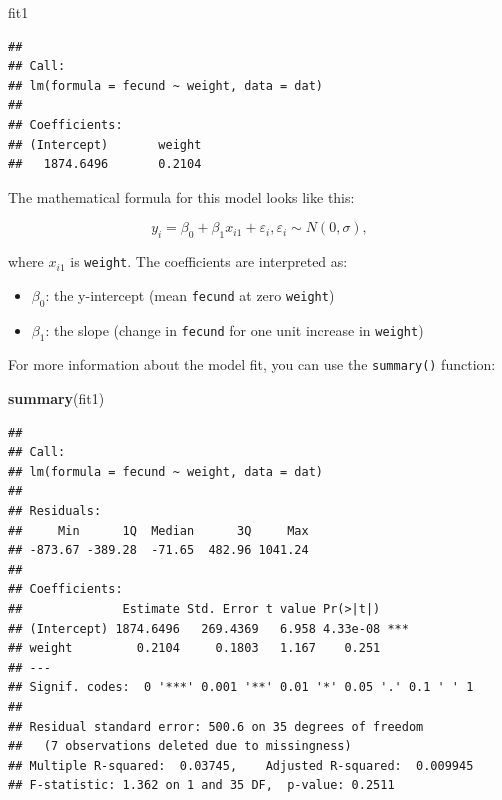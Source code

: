 \documentclass[]{book}
\newenvironment{Shaded}{\begin{snugshade}}{\end{snugshade}}
\newcommand{\KeywordTok}[1]{\textcolor[rgb]{0.13,0.29,0.53}{\textbf{#1}}}
\newcommand{\NormalTok}[1]{#1}
\providecommand{\tightlist}{%
  \setlength{\itemsep}{0pt}\setlength{\parskip}{0pt}}
\theoremstyle{definition}
\theoremstyle{definition}
\theoremstyle{definition}
\theoremstyle{remark}
\begin{document}
\begin{Shaded}
\begin{Highlighting}[]
\NormalTok{fit1}
\end{Highlighting}
\end{Shaded}

\begin{verbatim}
## 
## Call:
## lm(formula = fecund ~ weight, data = dat)
## 
## Coefficients:
## (Intercept)       weight  
##   1874.6496       0.2104
\end{verbatim}

The mathematical formula for this model looks like this:

\begin{equation}
  y_i=\beta_0 + \beta_1 x_{i1} + \varepsilon_i, \varepsilon_i \sim N(0,\sigma),
\label{eq:lin-reg}
\end{equation}

where \(x_{i1}\) is \texttt{weight}. The coefficients are interpreted
as:

\begin{itemize}
\tightlist
\item
  \(\beta_0\): the y-intercept (mean \texttt{fecund} at zero
  \texttt{weight})
\item
  \(\beta_1\): the slope (change in \texttt{fecund} for one unit
  increase in \texttt{weight})
\end{itemize}

For more information about the model fit, you can use the
\texttt{summary()} function:

\begin{Shaded}
\begin{Highlighting}[]
\KeywordTok{summary}\NormalTok{(fit1)}
\end{Highlighting}
\end{Shaded}

\begin{verbatim}
## 
## Call:
## lm(formula = fecund ~ weight, data = dat)
## 
## Residuals:
##     Min      1Q  Median      3Q     Max 
## -873.67 -389.28  -71.65  482.96 1041.24 
## 
## Coefficients:
##              Estimate Std. Error t value Pr(>|t|)    
## (Intercept) 1874.6496   269.4369   6.958 4.33e-08 ***
## weight         0.2104     0.1803   1.167    0.251    
## ---
## Signif. codes:  0 '***' 0.001 '**' 0.01 '*' 0.05 '.' 0.1 ' ' 1
## 
## Residual standard error: 500.6 on 35 degrees of freedom
##   (7 observations deleted due to missingness)
## Multiple R-squared:  0.03745,    Adjusted R-squared:  0.009945 
## F-statistic: 1.362 on 1 and 35 DF,  p-value: 0.2511
\end{verbatim}
\end{document}

